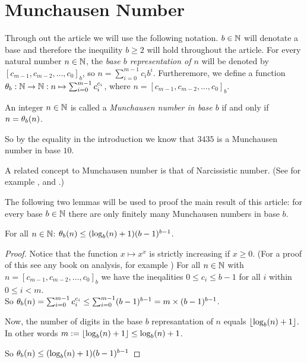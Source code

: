 \section*{Munchausen Number}
Through out the article we will use the following notation. $b \in \N$ will 
denotate a base and therefore the inequility $b \ge 2$ will hold throughout the
article. For every natural number $n \in \N$, the \emph{base $b$ representation
of $n$} will be denoted by $[c_{m-1}, c_{m-2}, \ldots, c_{0}]_{b}$, 
so $n = \sum_{i=0}^{m-1} c_{i}b^{i}$.
Furtheremore, we define a function $\P_{b} : \N \rightarrow \N : n \mapsto 
\sum_{i=0}^{m-1} c_{i}^{c_{i}}$, where $n = [c_{m-1},c_{m-2},\ldots,c_{0}]_{b}$.

\begin{definition}
	An integer $n \in \N$ is called a \emph{Munchausen number in base $b$} if 
	and only if $n = \P_{b}(n)$.
\end{definition}

So by the equality in the introduction we know that $3435$ is a Munchausen
number in base $10$. 

\begin{remark}
	A related concept to Munchausen number is that of Narcissistic number. 
	(See for example \cite{pickover}, \cite{wikipedia:narcissistic_number} and
	\cite{wolfram:narcissistic_number}.)
\end{remark}

The following two lemmas will be used to proof the main 
result of this article: for every base $b \in \N$ there are only finitely many 
Munchausen numbers in base $b$.

\begin{lemma}
	For all $n \in \N$: $\P_{b}(n) \le (\blog(n) + 1)(b-1)^{b-1}$.
\end{lemma}

\begin{proof}
	Notice that the function $x \mapsto x^{x}$ is strictly increasing if 
	$x \ge 0$. (For a proof of this see any book on analysis, for example 
	\cite{tao}) For all $n \in \N$ with 
	$n = [c_{m-1}, c_{m-2}, \ldots, c_{0}]_{b}$ we have the ineqalities 
	$0 \le c_{i} \le b-1$ for all $i$ within $0 \le i < m$.	\\
	So $\P_{b}(n) = \sum_{i=0}^{m-1} c_{i}^{c_{i}} \le 
	\sum_{i=0}^{m-1} (b-1)^{b-1} = m \times (b-1)^{b-1}$.
	
	Now, the number of digits in the base $b$ represantation of $n$ equals 
	$\floor{\blog(n) + 1}$. In other words $m := \floor{\blog(n) + 1} 
	\le \blog(n) + 1$.
	
	So $\P_{b}(n) \le (\blog(n) + 1)(b-1)^{b-1}$
\end{proof}

